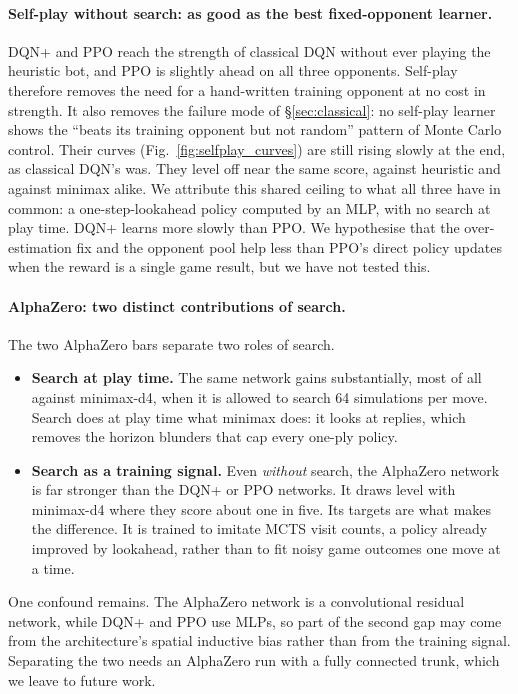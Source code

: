 \documentclass[11pt]{article}
\begin{document}
\paragraph{Self-play without search: as good as the best fixed-opponent
learner.} DQN+ and PPO reach the strength of classical DQN without ever playing
the heuristic bot, and PPO is slightly ahead on all three opponents. Self-play
therefore removes the need for a hand-written training opponent at no cost in
strength. It also removes the failure mode of \S\ref{sec:classical}: no
self-play learner shows the ``beats its training opponent but not random''
pattern of Monte Carlo control. Their curves (Fig.~\ref{fig:selfplay_curves})
are still rising slowly at the end, as classical DQN's was. They level off near
the same score, against heuristic and against minimax alike. We attribute this
shared ceiling to what all three have in common: a one-step-lookahead policy
computed by an MLP, with no search at play time. DQN+ learns more slowly than
PPO. We hypothesise that the over-estimation fix and the opponent pool help
less than PPO's direct policy updates when the reward is a single game result,
but we have not tested this.

\paragraph{AlphaZero: two distinct contributions of search.} The two AlphaZero
bars separate two roles of search.
\begin{itemize}[leftmargin=*]
  \item \textbf{Search at play time.} The same network gains substantially,
        most of all against minimax-d4, when it is allowed to search 64
        simulations per move. Search does at play time what minimax does: it
        looks at replies, which removes the horizon blunders that cap every
        one-ply policy.
  \item \textbf{Search as a training signal.} Even \emph{without} search, the
        AlphaZero network is far stronger than the DQN+ or PPO networks. It
        draws level with minimax-d4 where they score about one in five. Its
        targets are what makes the difference. It is trained to imitate MCTS
        visit counts, a policy already improved by lookahead, rather than to
        fit noisy game outcomes one move at a time.
\end{itemize}
One confound remains. The AlphaZero network is a convolutional residual
network, while DQN+ and PPO use MLPs, so part of the second gap may come from
the architecture's spatial inductive bias rather than from the training signal.
Separating the two needs an AlphaZero run with a fully connected trunk, which we leave to future work.
\end{document}
